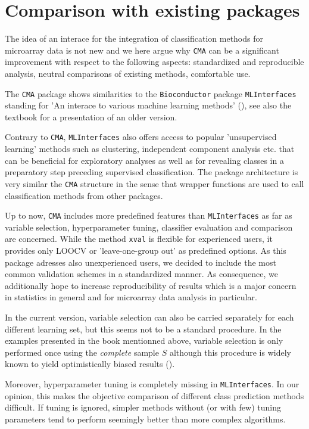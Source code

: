 \section{Comparison with existing packages}\label{sec:3}
The idea of an interace for the integration of classification methods for microarray
data is not new and we here argue why \texttt{CMA} can be a significant
improvement with respect to the following aspects: standardized and reproducible
analysis, neutral comparisons of existing methods, comfortable use.

The \texttt{CMA} package shows similarities to the \texttt{Bioconductor} 
package \texttt{MLInterfaces} standing for 'An interace to various machine 
learning methods' (\citet{Carey2007}), see  also the  
textbook  for a presentation of an older version. 

Contrary to \texttt{CMA}, \texttt{MLInterfaces} also offers access to popular 'unsupervised learning'
methods such as clustering, independent component analysis etc. that can
be beneficial for exploratory analyses as well as for revealing classes in
a preparatory step preceding supervised classification.
The package architecture is very similar the \texttt{CMA} structure in
the sense that wrapper functions are used to call classification methods from
other packages.

Up to now, \texttt{CMA} includes more predefined features than \texttt{MLInterfaces} 
as far as variable selection, hyperparameter tuning,
classifier evaluation and comparison are concerned. 
While the method \texttt{xval} is flexible for experienced users, it
provides only LOOCV or 'leave-one-group out' as predefined options.
As this package adresses also unexperienced users, we decided to include
the most common validation schemes in a standardized manner. As consequence,
we additionally hope to increase reproducibility of results which is a major
concern in statistics in general and for microarray data analysis in particular. 

In the current version, variable selection can also be carried separately for each different
learning set, but this seems not to be a standard procedure. In the examples
presented in the book mentionned above, variable selection is only performed once
using the \emph{complete} sample $S$ although this procedure is widely known 
to yield optimistically biased results (\citet{Amb2002}).

Moreover, hyperparameter tuning is completely missing in \texttt{MLInterfaces}. 
In our opinion, this makes the 
objective comparison of different class prediction methods difficult. 
If tuning is ignored, simpler methods without (or with few) tuning parameters
tend to perform seemingly better than more complex algorithms.

